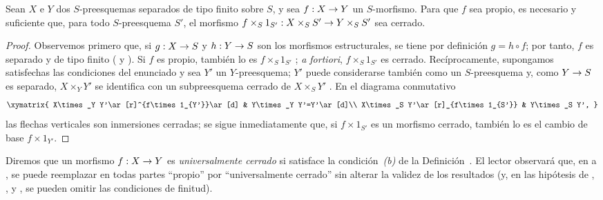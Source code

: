 \documentclass[oneside,10pt]{amsart}
\makeatletter
\newcommand{\ega@arrow}[2]{\mathchoice{#1}{#2}{#2}{#2}}
\renewcommand{\to}{\ega@arrow{\longrightarrow}{\rightarrow}}
\newcommand{\oldpage}[2][]{\marginnote{\normalfont\footnotesize\textbf{#1}~|~#2}\ignorespaces}
\let\EGAOriginalLabel\label
\renewcommand{\label}[1]{\phantomsection\EGAOriginalLabel{#1}}
\makeatother
\begin{document}
\begin{corollary}[5.4.8]
\label{II.5.4.8}
Sean $X$ e $Y$ dos $S$-preesquemas separados de tipo finito sobre $S$, y sea $f:X\to Y$ un $S$-morfismo.
Para que $f$ sea propio, es necesario y suficiente que, para todo $S$-preesquema $S'$, el morfismo $f\times_S 1_{S'}:X\times_S S'\to Y\times_S S'$ sea cerrado.
\end{corollary}

\begin{proof}
Observemos primero que, si $g:X\to S$ y $h:Y\to S$ son los morfismos estructurales, se tiene por definición $g=h\circ f$; por tanto, $f$ es separado y de tipo finito ( y ).
Si $f$ es propio, también lo es $f\times_S 1_{S'}$ ; \emph{a fortiori}, $f\times_S 1_{S'}$ es cerrado.
Recíprocamente, supongamos satisfechas las condiciones del enunciado y sea $Y'$ un $Y$-preesquema;
$Y'$ puede considerarse también como un $S$-preesquema y, como $Y\to S$ es separado, $X\times_Y Y'$ se identifica con un subpreesquema cerrado de $X\times_S Y'$ .
En el diagrama conmutativo
\[
  \xymatrix{
    X\times_Y Y'\ar[r]^{f\times1_{Y'}}\ar[d] &
    Y\times_Y Y'=Y'\ar[d]\\
    X\times_S Y'\ar[r]_{f\times1_{S'}} &
    Y\times_S Y',
  }
\]
las flechas verticales son inmersiones cerradas; se sigue inmediatamente que, si $f\times1_{S'}$ es un morfismo cerrado, también lo es el cambio de base $f\times1_{Y'}$.
\end{proof}

\begin{remark}[5.4.9]
\label{II.5.4.9}
Diremos que un morfismo $f:X\to Y$ es \emph{universalmente cerrado} si satisface la condición~\emph{(b)} de la Definición~.
El lector observará que,
\oldpage[II]{103}
en  a , se puede reemplazar en todas partes ``propio'' por ``universalmente cerrado'' sin alterar la validez de los resultados (y, en las hipótesis de , ,  y , se pueden omitir las condiciones de finitud).
\end{remark}
\end{document}
